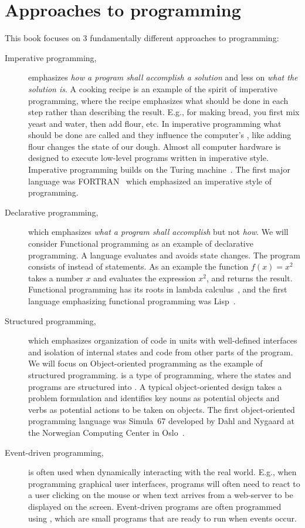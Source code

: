\section{Approaches to programming}
This book focuses on 3 fundamentally different approaches to programming: 
\begin{description}
\item[Imperative programming,] emphasizes \emph{how a program shall accomplish a solution} and less on \emph{what the solution is}. A cooking recipe is an example of the spirit of imperative programming, where the recipe emphasizes what should be done in each step rather than describing the result. E.g., for making bread, you first mix yeast and water, then add flour, etc. In imperative programming what should be done are called  and they influence the computer's , like adding flour changes the state of our dough. Almost all computer hardware is designed to execute low-level programs written in imperative style. Imperative programming builds on the Turing machine~\cite{turing36}. The first major language was FORTRAN~\cite{backus54} which emphasized an imperative style of programming.
\item[Declarative programming,] which emphasizes \emph{what a program shall accomplish} but not \emph{how}. We will consider Functional programming as an example of declarative programming. A  language evaluates  and avoids state changes. The program consists of  instead of statements. As an example the function $f(x) = x^2$ takes a number $x$ and evaluates the expression $x^2$, and returns the result. Functional programming has its roots in lambda calculus~\cite{church36}, and the first language emphasizing functional programming was Lisp~\cite{mccarthy60}. 
\item[Structured programming,] which emphasizes organization of code in units with well-defined interfaces and isolation of internal states and code from other parts of the program. We will focus on Object-oriented programming as the example of structured programming.  is a type of programming, where the states and programs are structured into . A typical object-oriented design takes a problem formulation and identifies key nouns as potential objects and verbs as potential actions to be taken on objects. The first object-oriented programming language was Simula~67 developed by Dahl and Nygaard at the Norwegian Computing Center in Oslo~\cite{dahl.nygaard67}.
\item[Event-driven programming,] is often used when dynamically interacting with the real world. E.g., when programming graphical user interfaces, programs will often need to react to a user clicking on the mouse or when text arrives from a web-server to be displayed on the screen. Event-driven programs are often programmed using , which are small programs that are ready to run when events occur.
\end{description}
